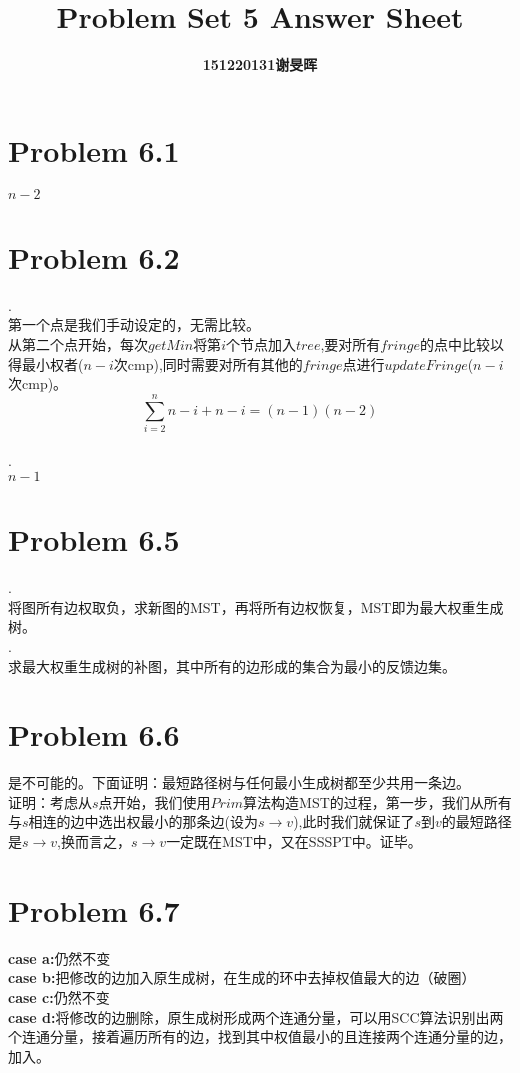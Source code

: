 \documentclass[twocolumn]{ctexart}
\begin{document}
	\title{Problem Set 5 Answer Sheet}
	\author{\textbf{151220131谢旻晖}}
	\date{}
	\maketitle

\section*{Problem 6.1}
\indent $n-2$

\section*{Problem 6.2}
.\\
\indent 第一个点是我们手动设定的，无需比较。\\
\indent
从第二个点开始，每次$getMin$将第$i$个节点加入$tree$,要对所有$fringe$的点中比较以得最小权者($n-i$次cmp),同时需要对所有其他的$fringe$点进行$updateFringe$($n-i$次cmp)。\\
\[
	\sum_{i=2}^{n}n-i+n-i=(n-1)(n-2)
\]
\\
.\\
\indent $n-1$

\section*{Problem 6.5}
.\\
\indent 将图所有边权取负，求新图的MST，再将所有边权恢复，MST即为最大权重生成树。\\
.\\
\indent 求最大权重生成树的补图，其中所有的边形成的集合为最小的反馈边集。

\section*{Problem 6.6}
\indent 是不可能的。下面证明：最短路径树与任何最小生成树都至少共用一条边。\\
\indent 证明：考虑从$s$点开始，我们使用$Prim$算法构造MST的过程，第一步，我们从所有与$s$相连的边中选出权最小的那条边(设为$s\rightarrow v$),此时我们就保证了$s$到$v$的最短路径是$s\rightarrow v$,换而言之，$s\rightarrow v$一定既在MST中，又在SSSPT中。证毕。

\section*{Problem 6.7}
\noindent\textbf{case a:}仍然不变\\
\textbf{case b:}把修改的边加入原生成树，在生成的环中去掉权值最大的边（破圈）\\
\textbf{case c:}仍然不变\\
\textbf{case d:}将修改的边删除，原生成树形成两个连通分量，可以用SCC算法识别出两个连通分量，接着遍历所有的边，找到其中权值最小的且连接两个连通分量的边，加入。\\
\end{document}
